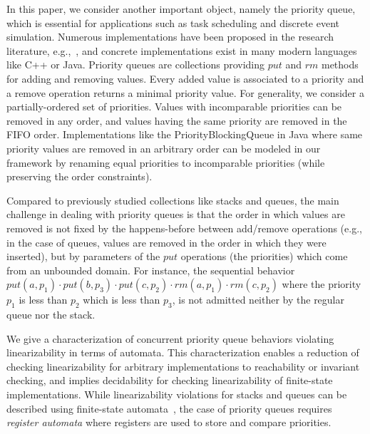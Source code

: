 \documentclass[a4paper,UKenglish]{lipics-v2016}
\begin{document}
In this paper, we consider another important object, namely the priority queue, which is essential for applications such as task scheduling and discrete event simulation. Numerous implementations have been proposed in the research literature, e.g.,~\cite{DBLP:conf/ppopp/AlistarhKLS15,DBLP:conf/wdag/CalciuMH14,DBLP:conf/opodis/LindenJ13,DBLP:conf/podc/ShavitZ99,DBLP:conf/ipps/ShavitL00}, and concrete implementations exist in many modern languages like C++ or Java.
Priority queues are collections providing $\textit{put}$ and $\textit{rm}$ methods for adding and removing values. Every added value is associated to a priority and a remove operation returns a minimal priority value. For generality, we consider a partially-ordered set of priorities. Values with incomparable priorities can be removed in any order, and values having the same priority are removed in the FIFO order. Implementations like the PriorityBlockingQueue in Java where same priority values are removed in an arbitrary order can be modeled in our framework by renaming equal priorities to incomparable priorities (while preserving the order constraints).

Compared to previously studied collections like stacks and queues, the main challenge in dealing with priority queues is that the order in which values are removed is not fixed by the happens-before between add/remove operations (e.g., in the case of queues, values are removed in the order in which they were inserted), but by parameters of the $\textit{put}$ operations (the priorities) which come from an unbounded domain. For instance, the sequential behavior $\textit{put}(a,p_1)\cdot \textit{put}(b,p_3)\cdot \textit{put}(c,p_2)\cdot \textit{rm}(a,p_1)\cdot \textit{rm}(c,p_2)$ where the priority $p_1$ is less than $p_2$ which is less than $p_3$, is not admitted neither by the regular queue nor the stack.



We give a characterization of concurrent priority queue behaviors violating linearizability in terms of automata. This characterization enables a reduction of checking linearizability for arbitrary implementations to reachability or invariant checking, and implies decidability for checking linearizability of finite-state implementations. While linearizability violations for stacks and queues can be described using finite-state automata~\cite{DBLP:conf/icalp/BouajjaniEEH15}, the case of priority queues requires \emph{register automata} where registers are used to store and compare priorities.
\end{document}
